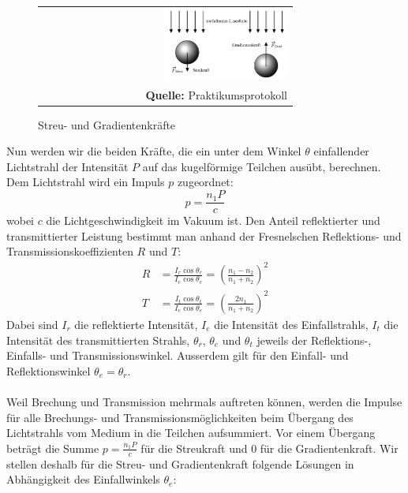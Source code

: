 \documentclass[a4paper,titlepage]{scrartcl}
\numberwithin{equation}{section}
\begin{document}
\begin{figure}[H]
	\centering
	\begin{tabular}{@{}r@{}}
		\includegraphics[width=0.5\textwidth]{images/streugradientenkraft.png}\\
		\footnotesize\sffamily\textbf{Quelle:} Praktikumsprotokoll \cite{protokoll}
	\end{tabular}
	\caption{Streu- und Gradientenkräfte}
    \label{fig:streugradient}
\end{figure}
Nun werden wir die beiden Kräfte, die ein unter dem Winkel $\theta$ einfallender Lichtstrahl der Intensität $P$ auf das kugelförmige Teilchen ausübt, berechnen. Dem Lichtstrahl wird ein Impuls $p$ zugeordnet:
\begin{equation*}
p=\frac{n_1 P}{c}
\end{equation*}
wobei $c$ die Lichtgeschwindigkeit im Vakuum ist. Den Anteil reflektierter und transmittierter Leistung bestimmt man anhand der Fresnelschen Reflektions- und Transmissionskoeffizienten $R$ und $T$:
\begin{align*}
R&=\frac{I_r \cos{\theta_r}}{I_e \cos{\theta_e}}=\left( \frac{n_1-n_2}{n_1+n_2} \right)^2\\
T&=\frac{I_t \cos{\theta_t}}{I_e \cos{\theta_e}}=\left( \frac{2n_1}{n_1+n_2} \right)^2
\end{align*}
Dabei sind $I_r$ die reflektierte Intensität, $I_e$ die Intensität des Einfallstrahls, $I_t$ die Intensität des transmittierten Strahls, $\theta_r$, $\theta_e$ und $\theta_t$ jeweils der Reflektions-, Einfalls- und Transmissionswinkel. Ausserdem gilt für den Einfall- und Reflektionswinkel $\theta_e=\theta_r$.\\ \\
Weil Brechung und Transmission mehrmals auftreten können, werden die Impulse für alle Brechungs- und Transmissionsmöglichkeiten beim Übergang des Lichtstrahls vom Medium in die Teilchen aufsummiert. Vor einem Übergang beträgt die Summe $p=\frac{n_1 P}{c}$ für die Streukraft und $0$ für die Gradientenkraft. Wir stellen deshalb für die Streu- und Gradientenkraft folgende Lösungen in Abhängigkeit des Einfallwinkels $\theta_e$:
\end{document}

